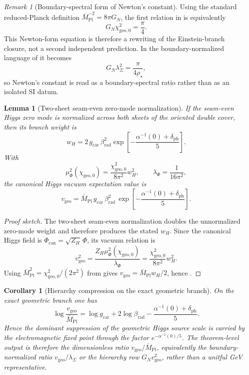 \documentclass[11pt,a4paper]{article}
\newtheorem{corollary}[theorem]{Corollary}
\newtheorem{lemma}[theorem]{Lemma}
\theoremstyle{definition}
\theoremstyle{remark}
\newtheorem*{remark}{Remark}
\newcommand{\Mpl}{\bar M_{\mathrm{Pl}}}
\newcommand{\gcar}{g_{\mathrm{car}}}
\newcommand{\chigeozero}{\chi_{\mathrm{geo},0}}
\newcommand{\vgeo}{v_{\mathrm{geo}}}
\begin{document}
\begin{remark}[Boundary-spectral form of Newton's constant]
Using the standard reduced-Planck definition $\Mpl^{-2}=8\pi G_N$, the first relation in  is equivalently
\[
G_N\chigeozero^2=\frac{\pi}{4}.
\]
This Newton-form equation is therefore a rewriting of the Einstein-branch closure, not a second
independent prediction. In the boundary-normalized language of
 it becomes
\[
G_N\lambda_\Sigma^2=\frac{\pi}{4\rho_\star},
\]
so Newton's constant is read as a boundary-spectral ratio rather than as an isolated SI datum.
\end{remark}

\begin{lemma}[Two-sheet seam-even zero-mode normalization]
\label{lem:two-sheet-zero-mode-normalization}
If the seam-even Higgs zero mode is normalized across both sheets of the oriented double cover, then its branch weight is
\[
w_H
=
2\,\gcar\,\beta_{\mathrm{rad}}^2
\exp\!\left[-\frac{\alpha^{-1}(0)+\delta_{\mathrm{ph}}}{5}\right].
\]
With
\[
\mu_\Phi^2(\chigeozero)=\frac{\chigeozero^2}{8\pi^2}w_H^2,
\qquad
\lambda_\Phi=\frac{1}{16\pi^2},
\]
the canonical Higgs vacuum expectation value is
\begin{equation}
\label{eq:carrier-dressed-v}
\vgeo
=
\Mpl\,\gcar\,\beta_{\mathrm{rad}}^2\,
\exp\!\left[-\frac{\alpha^{-1}(0)+\delta_{\mathrm{ph}}}{5}\right].
\end{equation}
\end{lemma}

\begin{proof}[Proof sketch]
The two-sheet seam-even normalization doubles the unnormalized zero-mode weight and therefore produces the stated $w_H$. Since the canonical Higgs field is $\Phi_{\mathrm{can}}=\sqrt{Z_H}\,\Phi$, its vacuum relation is
\[
\vgeo^2=\frac{Z_H\mu_\Phi^2(\chigeozero)}{\lambda_\Phi}
=
\frac{\chigeozero^2}{8\pi^2}w_H^2.
\]
Using $\Mpl^2=\chigeozero^2/(2\pi^2)$ from  gives $\vgeo=\Mpl w_H/2$, hence .
\end{proof}

\begin{corollary}[Hierarchy compression on the exact geometric branch]
\label{cor:hierarchy-compression-vgeo}
On the exact geometric branch one has
\[
\log\frac{\vgeo}{\Mpl}
=
\log\gcar
+
2\log\beta_{\mathrm{rad}}
-
\frac{\alpha^{-1}(0)+\delta_{\mathrm{ph}}}{5}.
\]
Hence the dominant suppression of the geometric Higgs source scale is carried by the electromagnetic
fixed point through the factor $e^{-\alpha^{-1}(0)/5}$. The theorem-level output is therefore the
dimensionless ratio $\vgeo/\Mpl$, equivalently the boundary-normalized ratio $\vgeo/\lambda_\Sigma$
or the hierarchy row $G_N\vgeo^2$, rather than a unitful GeV representative.
\end{corollary}
\end{document}
